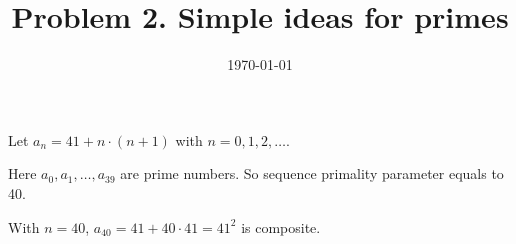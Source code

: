 \documentclass{article}
\title{Problem 2. Simple ideas for primes}
\author{}
\date{\today}
\begin{document}
\maketitle

Let $a_n = 41 + n \cdot (n+1)$ with $n=0, 1, 2, \ldots$.

Here $a_0, a_1, \ldots, a_{39}$ are prime numbers. So sequence primality parameter equals to 40.

With $n=40$, $a_{40} = 41 + 40 \cdot 41 = 41^2$ is composite.
\end{document}
